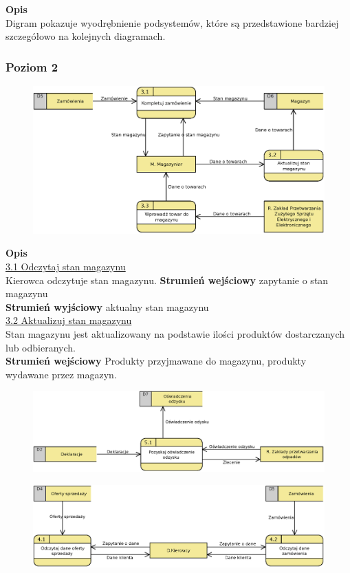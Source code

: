 	\linespread{1.6}

	\textbf{Opis}\\
	Digram pokazuje wyodrębnienie podsystemów, które są przedstawione bardziej szczegółowo na kolejnych diagramach.

\subsubsection{Poziom 2}
	\begin{figure}[H]
		\centering
		\includegraphics[width=\textwidth]{img/DFD/2-level-magazyn.eps}
	\end{figure}

	\textbf{Opis} \\
	\underline{3.1 Odczytaj stan magazynu}\\
	Kierowca odczytuje stan magazynu.
	\textbf{Strumień wejściowy} zapytanie o stan magazynu\\
	\textbf{Strumień wyjściowy} aktualny stan magazynu\\

	\underline{3.2 Aktualizuj stan magazynu}\\ 
	Stan magazynu jest aktualizowany na podstawie ilości produktów dostarczanych lub odbieranych.\\	
	\textbf{Strumień wejściowy} Produkty przyjmawane do magazynu, produkty wydawane przez magazyn.

	\begin{figure}[H]
		\centering
		\centerline{\includegraphics[width=1.1\textwidth]{img/DFD/2-level-skup.eps}}
	\end{figure}

	\begin{figure}[H]
		\centering
		\centerline{\includegraphics[width=1.1\textwidth]{img/DFD/2-level-kierowcy.eps}}
	\end{figure}